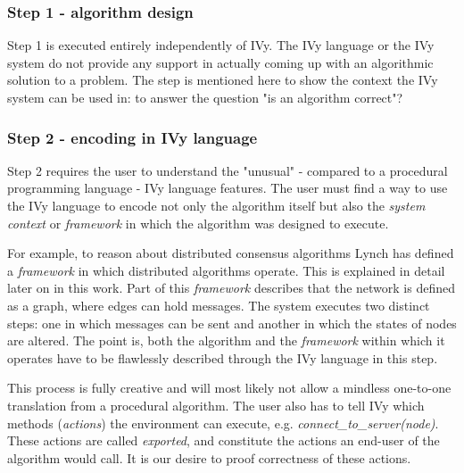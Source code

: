 \documentclass[fleqn]{article}
\begin{document}
\subsubsection{Step 1 - algorithm design}
Step 1 is executed entirely independently of IVy. The IVy language or the IVy system do not provide any support in actually coming up with an algorithmic solution to a problem.
The step is mentioned here to show the context the IVy system can be used in: to answer the question "is an algorithm correct"?

\subsubsection{Step 2 - encoding in IVy language}
Step 2 requires the user to understand the "unusual" \cite{refLanguageDoc} - compared to a procedural programming language -  IVy language features. The user must
find a way to use the IVy language to encode not only the algorithm itself but also the \textit{system context} or \textit{framework} in which the algorithm was designed to execute.

For example, to reason about distributed consensus algorithms Lynch has defined a \textit{framework} in which distributed algorithms operate.
This is explained in detail later on in this work. Part of this \textit{framework} describes that the network is defined as a graph, where edges can hold messages.
The system executes two distinct steps: one in which messages can be sent and another in which the states of nodes are altered.
The point is, both the algorithm and the \textit{framework} within which it operates have to be flawlessly described through the IVy language in this step.

This process is fully creative and will most likely not allow a mindless one-to-one translation from a procedural algorithm.
The user also has to tell IVy which methods (\textit{actions}) the environment can execute, e.g. \textit{connect\_to\_server(node)}.
These actions are called \textit{exported}, and constitute the actions an end-user of the algorithm would call. It is our desire to proof correctness of these actions.
\end{document}
